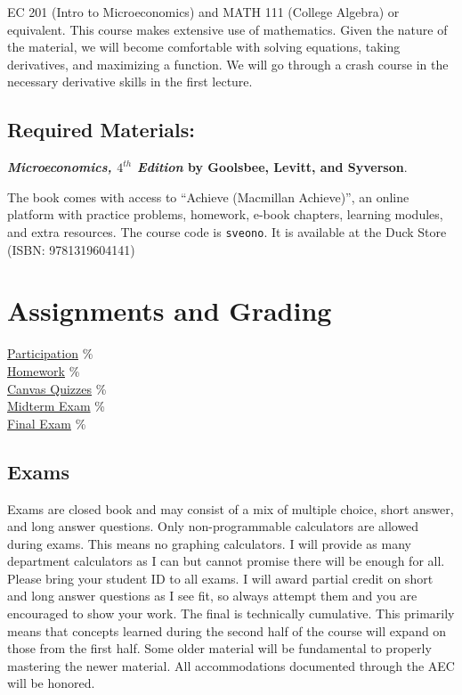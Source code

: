 EC 201 (Intro to Microeconomics) and MATH 111 (College Algebra) or equivalent.
This course makes extensive use of mathematics.
Given the nature of the material, we will become comfortable with solving equations, taking derivatives, and maximizing a function.
We will go through a crash course in the necessary derivative skills in the first lecture.

\subsection*{Required Materials:}

\textbf{\textit{Microeconomics, $4^{th}$ Edition} by Goolsbee, Levitt, and Syverson}.

The book comes with access to “Achieve (Macmillan Achieve)”, an online platform with practice problems, homework, e-book chapters, learning modules, and extra resources.
The course code is \texttt{sveono}.
It is available at the Duck Store (ISBN: 9781319604141)

\section{Assignments and Grading} 

\begin{center}\begin{minipage}{3.8in}\begin{flushleft}
    \hyperlink{grading_participation}{Participation} \% \\
    \hyperlink{grading_HW}{Homework}         \% \\
    \hyperlink{grading_quiz}{Canvas Quizzes} \% \\
    \hyperlink{grading_exam}{Midterm Exam}   \% \\
    \hyperlink{grading_exam}{Final Exam}     \% \\
\end{flushleft}\end{minipage}\end{center}

\hypertarget{grading_exam}{\subsection{Exams}}
Exams are closed book and may consist of a mix of multiple choice, short answer, and long answer questions.
Only non-programmable calculators are allowed during exams.
This means no graphing calculators.
I will provide as many department calculators as I can but cannot promise there will be enough for all.
Please bring your student ID to all exams.
I will award partial credit on short and long answer questions as I see fit, so always attempt them and you are encouraged to show your work.
The final is technically cumulative.
This primarily means that concepts learned during the second half of the course will expand on those from the first half.
Some older material will be fundamental to properly mastering the newer material.
All accommodations documented through the AEC will be honored.

